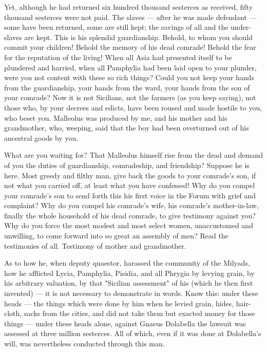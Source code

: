  Yet, although he had returned six hundred thousand sesterces as received, fifty thousand sesterces were not paid. The slaves --- after he was made defendant --- some have been returned, some are still kept; the savings of all and the under-slaves are kept. This is his splendid guardianship. Behold, to whom you should commit your children! Behold the memory of his dead comrade! Behold the fear for the reputation of the living! When all Asia had presented itself to be plundered and harried, when all Pamphylia had been laid open to your plunder, were you not content with these so rich things? Could you not keep your hands from the guardianship, your hands from the ward, your hands from the son of your comrade? Now it is not Sicilians, not the farmers (as you keep saying), not those who, by your decrees and edicts, have been roused and made hostile to you, who beset you. Malleolus was produced by me, and his mother and his grandmother, who, weeping, said that the boy had been overturned out of his ancestral goods by you.

 What are you waiting for? That Malleolus himself rise from the dead and demand of you the duties of guardianship, comradeship, and friendship? Suppose he is here. Most greedy and filthy man, give back the goods to your comrade's son, if not what you carried off, at least what you have confessed! Why do you compel your comrade's son to send forth this his first voice in the Forum with grief and complaint? Why do you compel his comrade's wife, his comrade's mother-in-law, finally the whole household of his dead comrade, to give testimony against you? Why do you force the most modest and most select women, unaccustomed and unwilling, to come forward into so great an assembly of men? Read the testimonies of all. Testimony of mother and grandmother.

 As to how he, when deputy quaestor, harassed the community of the Milyads, how he afflicted Lycia, Pamphylia, Pisidia, and all Phrygia by levying grain, by his arbitrary valuation, by that "Sicilian assessment" of his (which he then first invented) --- it is not necessary to demonstrate in words. Know this: under these heads --- the things which were done by him when he levied grain, hides, hair-cloth, sacks from the cities, and did not take them but exacted money for those things --- under these heads alone, against Gnaeus Dolabella the lawsuit was assessed at three million sesterces. All of which, even if it was done at Dolabella's will, was nevertheless conducted through this man.

